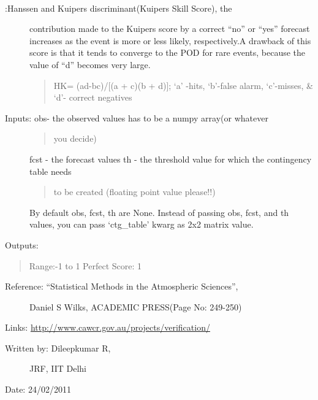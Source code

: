 \documentclass[letterpaper,10pt,english]{sphinxmanual}
\begin{document}

\begin{fulllineitems}
\label{diagnosis:ctgfunction.kss}~\begin{description}
\item[{{\hyperref[diagnosis:ctgfunction.kss]{}}:Hanssen and Kuipers discriminant(Kuipers Skill Score), the}] \leavevmode
contribution made to the Kuipers score by a correct ``no'' or
``yes'' forecast increases as the event is more or less likely,
respectively.A drawback of this score is that it tends to converge
to the POD for rare events, because the value of ``d'' becomes very
large.
\begin{quote}

HK= (ad-bc)/{[}(a + c)(b + d){]}; `a' -hits, `b'-false alarm,
`c'-misses, \& `d'- correct negatives
\end{quote}

\item[{Inputs: obs- the observed values has to be a numpy array(or whatever}] \leavevmode\begin{quote}

you decide)
\end{quote}

fcst - the forecast values
th  - the threshold value for which the contingency table needs
\begin{quote}

to be created (floating point value please!!)
\end{quote}

By default obs, fcst, th are None. Instead of passing obs, fcst,
and th values, you can pass `ctg\_table' kwarg as 2x2 matrix value.

\end{description}

Outputs:
\begin{quote}

Range:-1 to 1
Perfect Score: 1
\end{quote}
\begin{description}
\item[{Reference: ``Statistical Methods in the Atmospheric Sciences'',}] \leavevmode
Daniel S Wilks, ACADEMIC PRESS(Page No: 249-250)

\end{description}

Links: \href{http://www.cawcr.gov.au/projects/verification/}{http://www.cawcr.gov.au/projects/verification/}
\begin{description}
\item[{Written by: Dileepkumar R,}] \leavevmode
JRF, IIT Delhi

\end{description}

Date: 24/02/2011

\end{fulllineitems}
\end{document}
